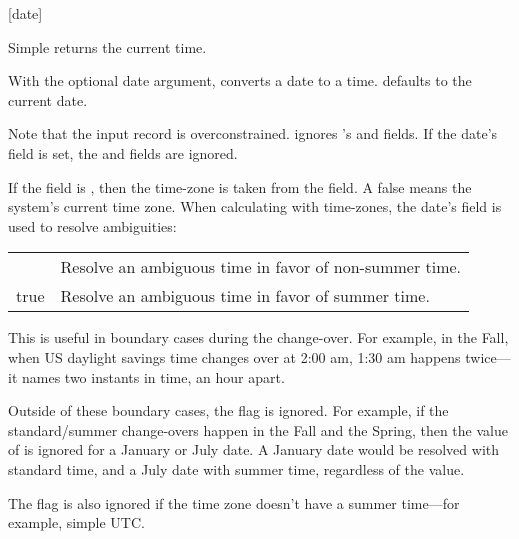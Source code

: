  {} \integer
{} {[date]} \integer
\begin{desc}
    Simple  returns the current time.
    
    With the optional date argument,  converts a date to a time.
     defaults to the current date.

    Note that the input  record is overconstrained.
     ignores 's  and  fields. 
    If the date's  field is set, the  and
     fields are ignored.

    If the  field is , then the time-zone is taken
    from the  field. A false  means the system's
    current time zone. When calculating with time-zones, the date's
     field is used to resolve ambiguities:
\begin{tightinset}
\begin{tabular}{ll}    
\ex{\#f} &      Resolve an ambiguous time in favor of non-summer time. \\
true     &      Resolve an ambiguous time in favor of summer time.
\end{tabular}
\end{tightinset}
    This is useful in boundary cases during the change-over. For example,
    in the Fall, when US daylight savings time changes over at 2:00 am,
    1:30 am happens twice---it names two instants in time, an hour apart.

    Outside of these boundary cases, the  flag is ignored. For
    example, if the standard/summer change-overs happen in the Fall and the
    Spring, then the value of  is ignored for a January or 
    July date. A January date would be resolved with standard time, and a 
    July date with summer time, regardless of the  value.

    The  flag is also ignored if the time zone doesn't have 
    a summer time---for example, simple UTC.
\end{desc}


